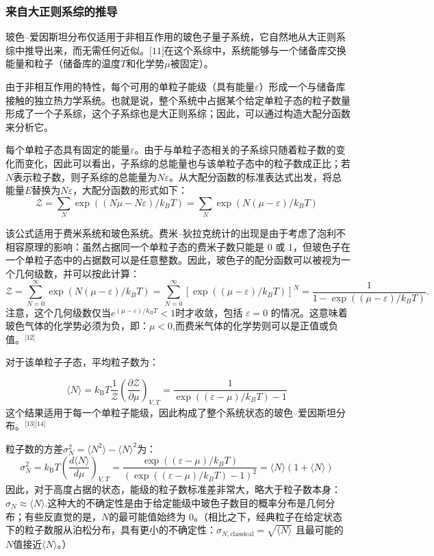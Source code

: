\subsubsection{来自大正则系综的推导}  
玻色–爱因斯坦分布仅适用于非相互作用的玻色子量子系统，它自然地从大正则系综中推导出来，而无需任何近似。\(\text{[11]}\)在这个系综中，系统能够与一个储备库交换能量和粒子（储备库的温度\(T\)和化学势\(\mu\)被固定）。

由于非相互作用的特性，每个可用的单粒子能级（具有能量\(\varepsilon\)）形成一个与储备库接触的独立热力学系统。也就是说，整个系统中占据某个给定单粒子态的粒子数量形成了一个子系综，这个子系综也是大正则系综；因此，可以通过构造大配分函数来分析它。

每个单粒子态具有固定的能量\(\varepsilon\)。由于与单粒子态相关的子系综只随着粒子数的变化而变化，因此可以看出，子系综的总能量也与该单粒子态中的粒子数成正比；若\(N\)表示粒子数，则子系综的总能量为\(N\varepsilon\)。从大配分函数的标准表达式出发，将总能量\(E\)替换为\(N\varepsilon\)，大配分函数的形式如下：
\[
\mathcal{Z} = \sum_{N} \exp\left((N\mu - N\varepsilon)/k_B T\right) = \sum_{N} \exp\left(N(\mu - \varepsilon)/k_B T\right)~
\]

该公式适用于费米系统和玻色系统。费米–狄拉克统计的出现是由于考虑了泡利不相容原理的影响：虽然占据同一个单粒子态的费米子数只能是 0 或 1，但玻色子在一个单粒子态中的占据数可以是任意整数。因此，玻色子的配分函数可以被视为一个几何级数，并可以按此计算：
\[
\mathcal{Z} = \sum_{N=0}^{\infty} \exp\left(N(\mu - \varepsilon)/k_B T\right) = \sum_{N=0}^{\infty} \left[\exp\left((\mu - \varepsilon)/k_B T\right)\right]^N = \frac{1}{1 - \exp\left((\mu - \varepsilon)/k_B T\right)}.~
\]
注意，这个几何级数仅当\(e^{(\mu - \varepsilon)/k_B T} < 1\)时才收敛，包括 \( \varepsilon = 0 \) 的情况。这意味着玻色气体的化学势必须为负，即：\(\mu < 0\),而费米气体的化学势则可以是正值或负值。\(^\text{[12]}\)

对于该单粒子子态，平均粒子数为：

\[
\langle N \rangle = k_{\text{B}} T \frac{1}{\mathcal{Z}} \left( \frac{\partial \mathcal{Z}}{\partial \mu} \right)_{V,T} = \frac{1}{\exp\left( (\varepsilon - \mu)/k_B T\right) - 1}~
\]
这个结果适用于每一个单粒子能级，因此构成了整个系统状态的玻色–爱因斯坦分布。\(^\text{[13][14]}\)

粒子数的方差\(\sigma_N^2 = \langle N^2 \rangle - \langle N \rangle^2\)为：
\[
\sigma_N^2 = k_{\text{B}} T \left( \frac{d \langle N \rangle}{d\mu} \right)_{V,T} = \frac{\exp\left( (\varepsilon - \mu)/k_B T\right)}{\left( \exp\left( (\varepsilon - \mu)/k_B T\right) - 1 \right)^2} = \langle N \rangle (1 + \langle N \rangle)~
\]
因此，对于高度占据的状态，能级的粒子数标准差非常大，略大于粒子数本身：\(\sigma_N \approx \langle N \rangle\).这种大的不确定性是由于给定能级中玻色子数目的概率分布是几何分布；有些反直觉的是，\( N \)的最可能值始终为 0。（相比之下，经典粒子在给定状态下的粒子数服从泊松分布，具有更小的不确定性：\(\sigma_{N,{\text{classical}}} = \sqrt{\langle N \rangle}\)
且最可能的\( N\)值接近\(\langle N \rangle\)。）

